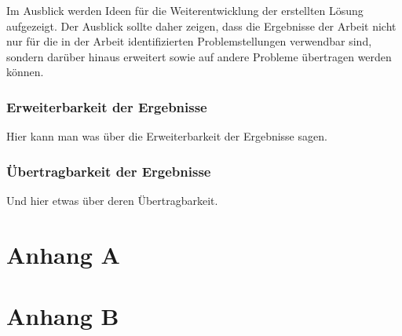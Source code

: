 \documentclass[oneside]{ausarbeitung}
\begin{document}
Im Ausblick werden Ideen für die Weiterentwicklung der erstellten Lösung 
aufgezeigt. Der Ausblick sollte daher zeigen, dass die Ergebnisse der 
Arbeit nicht nur für die in der Arbeit identifizierten Problemstellungen 
verwendbar sind, sondern darüber hinaus erweitert sowie auf andere 
Probleme übertragen werden können.

\subsection{Erweiterbarkeit der Ergebnisse}
\label{sub:erweiterbarkeit}

Hier kann man was über die Erweiterbarkeit der Ergebnisse sagen.

\subsection{Übertragbarkeit der Ergebnisse}
\label{sub:uebertragbarkeit}

Und hier etwas über deren Übertragbarkeit.

\appendix

\printbibliography[heading=bibintoc]

\chapter{Anhang A}

\chapter{Anhang B}
\end{document}
